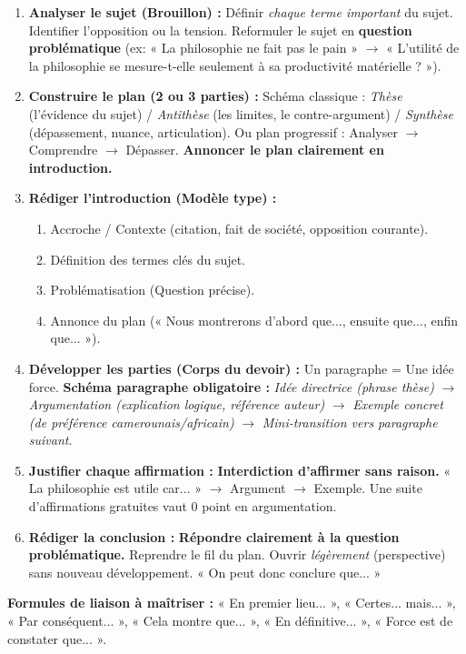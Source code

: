\documentclass[11pt]{article}
\begin{document}
\begin{methode}
\begin{enumerate}
\item \textbf{Analyser le sujet (Brouillon) :} Définir \emph{chaque terme important} du sujet. Identifier l'opposition ou la tension. Reformuler le sujet en \textbf{question problématique} (ex: « La philosophie ne fait pas le pain » $\rightarrow$ « L'utilité de la philosophie se mesure-t-elle seulement à sa productivité matérielle ? »).
\item \textbf{Construire le plan (2 ou 3 parties) :} Schéma classique : \emph{Thèse} (l'évidence du sujet) / \emph{Antithèse} (les limites, le contre-argument) / \emph{Synthèse} (dépassement, nuance, articulation). Ou plan progressif : Analyser $\rightarrow$ Comprendre $\rightarrow$ Dépasser. \textbf{Annoncer le plan clairement en introduction.}
\item \textbf{Rédiger l'introduction (Modèle type) :}
    \begin{enumerate}
    \item Accroche / Contexte (citation, fait de société, opposition courante).
    \item Définition des termes clés du sujet.
    \item Problématisation (Question précise).
    \item Annonce du plan (« Nous montrerons d'abord que..., ensuite que..., enfin que... »).
    \end{enumerate}
\item \textbf{Développer les parties (Corps du devoir) :} Un paragraphe = Une idée force.
    \textbf{Schéma paragraphe obligatoire :} \emph{Idée directrice (phrase thèse)} $\rightarrow$ \emph{Argumentation (explication logique, référence auteur)} $\rightarrow$ \emph{Exemple concret (de préférence camerounais/africain)} $\rightarrow$ \emph{Mini-transition vers paragraphe suivant}.
\item \textbf{Justifier chaque affirmation :} \textbf{Interdiction d'affirmer sans raison.} « La philosophie est utile car... » $\rightarrow$ Argument $\rightarrow$ Exemple. Une suite d'affirmations gratuites vaut 0 point en argumentation.
\item \textbf{Rédiger la conclusion :} \textbf{Répondre clairement à la question problématique.} Reprendre le fil du plan. Ouvrir \emph{légèrement} (perspective) sans nouveau développement. « On peut donc conclure que... »
\end{enumerate}
\textbf{Formules de liaison à maîtriser :} « En premier lieu... », « Certes... mais... », « Par conséquent... », « Cela montre que... », « En définitive... », « Force est de constater que... ».
\end{methode}
\end{document}
